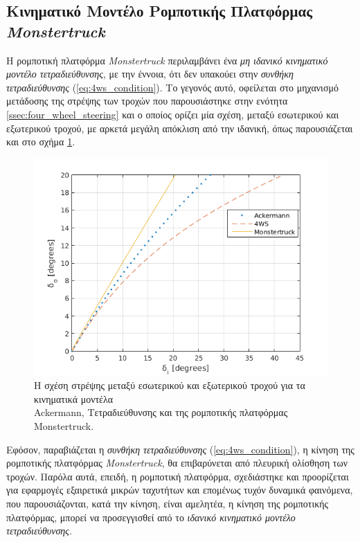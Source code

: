 \newpage
\bigskip
\subsection{Κινηματικό Μοντέλο Ρομποτικής Πλατφόρμας \textit{Monstertruck}} \label{ssec:monstertruck_kinematics}
Η ρομποτική πλατφόρμα \textit{Monstertruck} περιλαμβάνει ένα \textit{μη ιδανικό κινηματικό μοντέλο τετραδιεύθυνσης}, με την έννοια, ότι δεν υπακούει στην \textit{συνθήκη τετραδιεύθυνσης} (\ref{eq:4ws_condition}). Το γεγονός αυτό, οφείλεται στο μηχανισμό μετάδοσης της στρέψης των τροχών που παρουσιάστηκε στην ενότητα \ref{ssec:four_wheel_steering} και ο οποίος ορίζει μία σχέση, μεταξύ εσωτερικού και εξωτερικού τροχού, με αρκετά μεγάλη απόκλιση από την ιδανική, όπως παρουσιάζεται και στο σχήμα \ref{fig:steer_angles_comparison}.

\begin{figure}[!ht]
	\centering
	\includegraphics[width=0.6\linewidth]{Chapters/Chapter2/Figures/steer_angles_comparison.png}
	\caption{Η σχέση στρέψης μεταξύ εσωτερικού και εξωτερικού τροχού για τα κινηματικά μοντέλα \\Ackermann, Τετραδιεύθυνσης και της ρομποτικής πλατφόρμας Monstertruck.}
	\label{fig:steer_angles_comparison}
\end{figure}

Εφόσον, παραβιάζεται η \textit{συνθήκη τετραδιεύθυνσης} (\ref{eq:4ws_condition}), η κίνηση της ρομποτικής πλατφόρμας \textit{Monstertruck}, θα επιβαρύνεται από πλευρική ολίσθηση των τροχών. Παρόλα αυτά, επειδή, η ρομποτική πλατφόρμα, σχεδιάστηκε και προορίζεται για εφαρμογές εξαιρετικά μικρών ταχυτήτων και επομένως τυχόν δυναμικά φαινόμενα, που παρουσιάζονται, κατά την κίνηση, είναι αμελητέα, η κίνηση της ρομποτικής πλατφόρμας, μπορεί να προσεγγισθεί από το \textit{ιδανικό κινηματικό μοντέλο τετραδιεύθυνσης}. 

